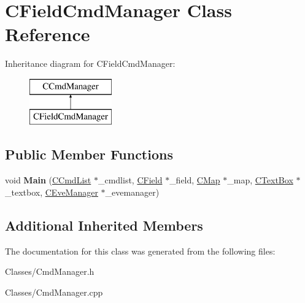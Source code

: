 \hypertarget{class_c_field_cmd_manager}{}\section{C\+Field\+Cmd\+Manager Class Reference}
\label{class_c_field_cmd_manager}
Inheritance diagram for C\+Field\+Cmd\+Manager\+:\begin{figure}[H]
\begin{center}
\leavevmode
\includegraphics[height=2.000000cm]{class_c_field_cmd_manager}
\end{center}
\end{figure}
\subsection*{Public Member Functions}
\begin{DoxyCompactItemize}
\item 
void {\bfseries Main} (\hyperlink{class_c_cmd_list}{C\+Cmd\+List} $\ast$\+\_\+cmdlist, \hyperlink{class_c_field}{C\+Field} $\ast$\+\_\+field, \hyperlink{class_c_map}{C\+Map} $\ast$\+\_\+map, \hyperlink{class_c_text_box}{C\+Text\+Box} $\ast$\+\_\+textbox, \hyperlink{class_c_eve_manager}{C\+Eve\+Manager} $\ast$\+\_\+evemanager)\hypertarget{class_c_field_cmd_manager_afe22cb252b6d126fa8786145e2de6cd7}{}\label{class_c_field_cmd_manager_afe22cb252b6d126fa8786145e2de6cd7}

\end{DoxyCompactItemize}
\subsection*{Additional Inherited Members}


The documentation for this class was generated from the following files\+:\begin{DoxyCompactItemize}
\item 
Classes/Cmd\+Manager.\+h\item 
Classes/Cmd\+Manager.\+cpp\end{DoxyCompactItemize}
